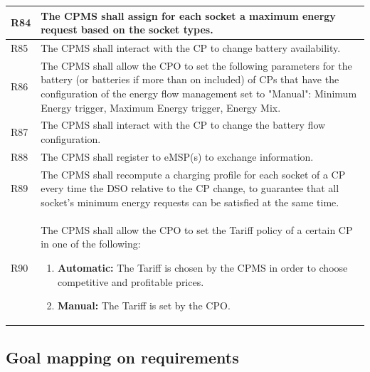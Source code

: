 \documentclass{Configuration_Files/PoliMi3i_thesis}
\begin{document}
\begin{xltabular}{\textwidth}{| >{}l | X |}
R84  &
    The CPMS shall assign for each socket a maximum energy request based on the socket types.\B\\
\hline

R85 &
    The CPMS shall interact with the CP to change battery availability.\B\\
\hline

R86 &
    The CPMS shall allow the CPO to set the following  parameters for the battery (or batteries if more than on included) of CPs that have the configuration of the energy flow management set to  "Manual": Minimum Energy trigger, Maximum Energy trigger, Energy Mix.\B\\
\hline

R87 &
    The CPMS shall interact with the CP to change the battery flow configuration.\B\\
\hline

R88  &
    The CPMS shall register to eMSP(s) to exchange information.\B\\
\hline

R89  &
    The CPMS shall recompute a charging profile for each socket of a CP every time the DSO relative to the CP change, to guarantee that all socket's minimum energy requests can be satisfied at the same time.\B\\
\hline

R90 &
    The CPMS shall allow the CPO to set the Tariff policy of a certain CP in one of the following:
    \begin{enumerate}
        \item \textbf{Automatic:} The Tariff is chosen by the CPMS in order to choose competitive and profitable prices.   
        \item\textbf{Manual:} The Tariff is set by the CPO. 
    \end{enumerate}\B\\
\hline
\end{xltabular}

\subsection{Goal mapping on requirements}
\end{document}
